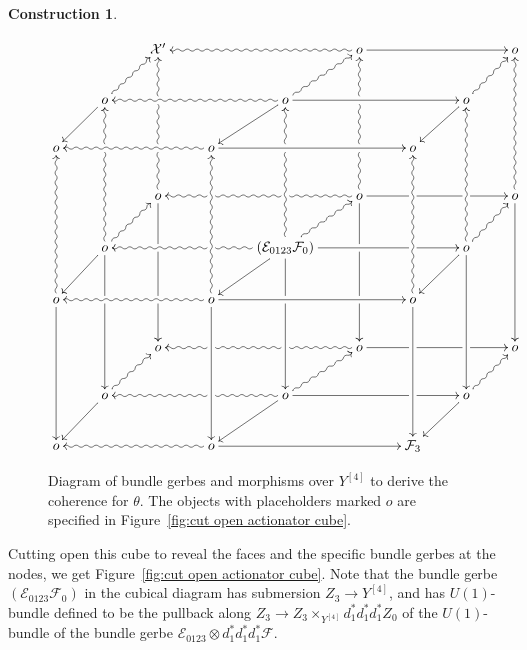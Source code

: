 \documentclass[12pt]{amsart}
\theoremstyle{plain}
\theoremstyle{definition}
\newtheorem{construction}[theorem]{Construction}
\theoremstyle{remark}
\numberwithin{equation}{section}
\newcommand{\cE}{{\mathcal E}}
\newcommand{\cF}{{\mathcal F}}
\newcommand{\<}{\langle}
\renewcommand{\>}{\rangle}
\begin{document}
\begin{construction}
\begin{enumerate}
\begin{figure}
\[
	\xymatrix{   %
		&& \mathcal{X}' &&& \ar@{~>}[lll]_{} o\ar[rrr] &&& o\\
		& o \ar@{~>}[ur]^{} \ar[dl] &&& \ar@{~>}[lll]_{} o\ar@{~>}[ur]^{} \ar[dl] \ar[rrr] &&& 			o \ar@{~>}[ur]^{} \ar[dl]\\
		o &&& \ar@{~>}[lll]^{} o \ar[rrr] &&& o
		\\
		&& o \ar@{~>}[uuu]^{}|!{[ur];[ull]}{\hole}|!{[uurr];[uul]}{\hole} \ar[ddd]|!{[drr];[dl]}{\hole}|!{[ddr];[ddll]}{\hole}&&& 
			\ar@{~>}[lll]^{}|!{[ull];[ul]}{\hole}|!{[ddll];[ull]}{\hole} o \ar@{~>}^{}|!{[ull];[ul]}{\hole}|!{[uurr];[uul]}{\hole}[uuu]   \ar[rrr]|!{[ddr];[ur]}{\hole}|!{[drr];[uurr]}{\hole} \ar[ddd]|!{[dl];[drr]}{\hole}|!{[ddll];[ddr]}{\hole}	&&& 
			o \ar@{~>}[uuu]^{} \ar[ddd]\\
		& o \ar@{~>}[uuu]^{}|!{[uurr];[uul]}{\hole} \ar@{~>}[ur]^{} \ar[dl] \ar[ddd]|!{[drr];[dl]}{\hole}&&& 
			\ar@{~>}[lll]^{}|!{[dl];[uul]}{\hole} (\cE_{0123}\cF_0)				\ar@{~>}[ur]^{} \ar@{~>}[uuu]^{}|!{[uul];[uurr]}{\hole} \ar[dl] \ar[rrr]|!{[drr];[uurr]}{\hole} \ar[ddd]|!{[dl];[drr]}{\hole} &&& 
			o \ar@{~>}[ur]^{}\ar@{~>}[uuu]^{} \ar[dl] \ar[ddd]\\
		o \ar@{~>}[uuu]^{} \ar[ddd] &&& \ar@{~>}[lll]^{}o \ar@{~>}[uuu]^{}\ar[ddd] \ar[rrr] &&			& o \ar@{~>}[uuu]^{} \ar[ddd]
		\\
		&& o &&& \ar@{~>}[lll]^{}|!{[uul];[dl]}{\hole}|!{[ull];[ddll]}{\hole} o\ar[rrr]|!{[ur];[ddr]}{\hole}|!{[uurr];[drr]}{\hole} &&& o\\
		& o \ar@{~>}[ur]^{} \ar[dl] &&& \ar@{~>}[lll]^{}|!{[uul];[dl]}{\hole} o\ar@{~>}[ur]^{} \ar[dl] \ar[rrr]|!{[uurr];[drr]}{\hole} &&& o \ar@{~>}[ur]_{} \ar[dl]\\
		o &&& \ar@{~>}[lll]_{} o \ar[rrr] &&& \cF_3\\
	}
\]
\caption{Diagram of bundle gerbes and morphisms over $Y^{[4]}$ to derive the coherence for $\theta$. The objects with placeholders marked $o$ are specified in Figure~\ref{fig:cut open actionator cube}.}
\label{fig:big_cube_triv}
\end{figure}

Cutting open this cube to reveal the faces and the specific bundle gerbes at the nodes, we get Figure~\ref{fig:cut open actionator cube}. Note that the bundle gerbe $(\cE_{0123}\cF_0)$ in the cubical diagram has submersion $Z_3\to Y^{[4]}$, and has $U(1)$-bundle defined to be the pullback along $Z_3\to Z_3\times_{Y^{[4]}}d_1^*d_1^*d_1^*Z_0$ of the $U(1)$-bundle of the bundle gerbe $\cE_{0123}\otimes d_1^*d_1^*d_1^*\cF$.



\end{enumerate}
\end{construction}
\end{document}
